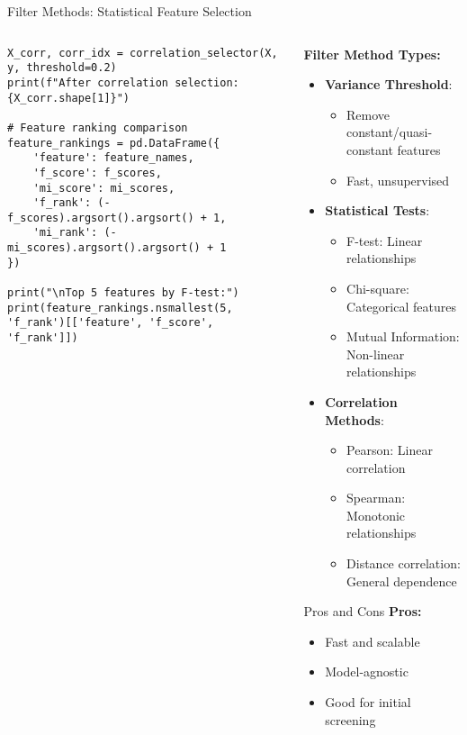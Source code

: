 \documentclass[aspectratio=169,11pt]{beamer}
\begin{document}
\begin{frame}[fragile]{Filter Methods: Statistical Feature Selection}
\begin{columns}
\begin{column}{0.55\textwidth}
\begin{lstlisting}
X_corr, corr_idx = correlation_selector(X, y, threshold=0.2)
print(f"After correlation selection: {X_corr.shape[1]}")

# Feature ranking comparison
feature_rankings = pd.DataFrame({
    'feature': feature_names,
    'f_score': f_scores,
    'mi_score': mi_scores,
    'f_rank': (-f_scores).argsort().argsort() + 1,
    'mi_rank': (-mi_scores).argsort().argsort() + 1
})

print("\nTop 5 features by F-test:")
print(feature_rankings.nsmallest(5, 'f_rank')[['feature', 'f_score', 'f_rank']])
\end{lstlisting}
\end{column}
\begin{column}{0.45\textwidth}
\textbf{Filter Method Types:}

\begin{itemize}
\item \textbf{Variance Threshold}:
  \begin{itemize}
  \item Remove constant/quasi-constant features
  \item Fast, unsupervised
  \end{itemize}

\item \textbf{Statistical Tests}:
  \begin{itemize}
  \item F-test: Linear relationships
  \item Chi-square: Categorical features
  \item Mutual Information: Non-linear relationships
  \end{itemize}

\item \textbf{Correlation Methods}:
  \begin{itemize}
  \item Pearson: Linear correlation
  \item Spearman: Monotonic relationships
  \item Distance correlation: General dependence
  \end{itemize}
\end{itemize}

\begin{block}{Pros and Cons}
\textbf{Pros:}
\begin{itemize}
\item Fast and scalable
\item Model-agnostic
\item Good for initial screening
\end{itemize}


\end{block}
\end{column}
\end{columns}
\end{frame}
\end{document}
